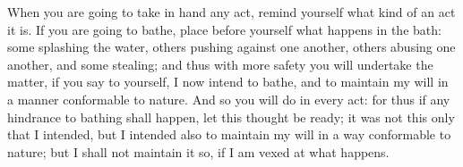 When you are going to take in hand any act, remind yourself what kind of an act
it is.  If you are going  to bathe, place  before yourself what happens  in the
bath:  some splashing  the water,  others pushing  against one  another, others
abusing one  another, and  some stealing;  and thus with  more safety  you will
undertake the  matter, if you say  to yourself, I  now intend to bathe,  and to
maintain my will in a manner conformable to nature. And so you will do in every
act: for  thus if any  hindrance to bathing shall  happen, let this  thought be
ready; it was not this only that I intended, but I intended also to maintain my
will in a  way conformable to nature; but  I shall not maintain it so,  if I am
vexed at what happens.
